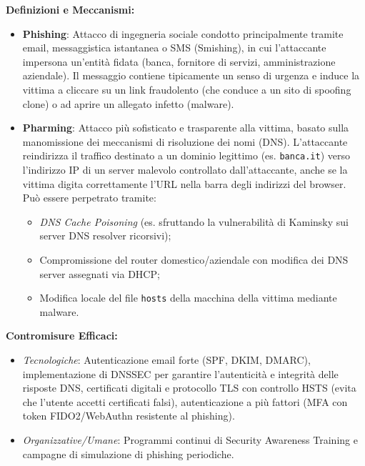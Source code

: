 \documentclass[11pt,a4paper]{article}
\begin{document}
\begin{solutionbox}
\textbf{Definizioni e Meccanismi:}
\begin{itemize}
    \item \textbf{Phishing}: Attacco di ingegneria sociale condotto principalmente tramite email, messaggistica istantanea o SMS (Smishing), in cui l'attaccante impersona un'entit\`a fidata (banca, fornitore di servizi, amministrazione aziendale). Il messaggio contiene tipicamente un senso di urgenza e induce la vittima a cliccare su un link fraudolento (che conduce a un sito di spoofing clone) o ad aprire un allegato infetto (malware).
    \item \textbf{Pharming}: Attacco pi\`u sofisticato e trasparente alla vittima, basato sulla manomissione dei meccanismi di risoluzione dei nomi (DNS). L'attaccante reindirizza il traffico destinato a un dominio legittimo (es. \texttt{banca.it}) verso l'indirizzo IP di un server malevolo controllato dall'attaccante, anche se la vittima digita correttamente l'URL nella barra degli indirizzi del browser. Pu\`o essere perpetrato tramite:
    \begin{itemize}
        \item \textit{DNS Cache Poisoning} (es. sfruttando la vulnerabilit\`a di Kaminsky sui server DNS resolver ricorsivi);
        \item Compromissione del router domestico/aziendale con modifica dei DNS server assegnati via DHCP;
        \item Modifica locale del file \texttt{hosts} della macchina della vittima mediante malware.
    \end{itemize}
\end{itemize}

\textbf{Contromisure Efficaci:}
\begin{itemize}
    \item \textit{Tecnologiche}: Autenticazione email forte (SPF, DKIM, DMARC), implementazione di DNSSEC per garantire l'autenticit\`a e integrit\`a delle risposte DNS, certificati digitali e protocollo TLS con controllo HSTS (evita che l'utente accetti certificati falsi), autenticazione a pi\`u fattori (MFA con token FIDO2/WebAuthn resistente al phishing).
    \item \textit{Organizzative/Umane}: Programmi continui di Security Awareness Training e campagne di simulazione di phishing periodiche.
\end{itemize}
\end{solutionbox}
\end{document}
